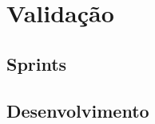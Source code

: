\chapter{Validação}
\label{sec:validacao}



\section{Sprints}
\label{sec:sprints}

\section{Desenvolvimento}
\label{sec:desenvolvimento}
\blankpage

\glsresetall
